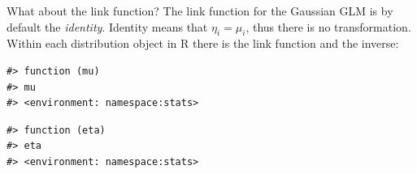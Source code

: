 \documentclass[
  ignorenonframetext,
]{beamer}
\newenvironment{Shaded}{\begin{snugshade}}{\end{snugshade}}
\newcommand{\AttributeTok}[1]{\textcolor[rgb]{0.40,0.45,0.13}{#1}}
\newcommand{\CommentTok}[1]{\textcolor[rgb]{0.37,0.37,0.37}{#1}}
\newcommand{\FunctionTok}[1]{\textcolor[rgb]{0.28,0.35,0.67}{#1}}
\newcommand{\NormalTok}[1]{\textcolor[rgb]{0.00,0.23,0.31}{#1}}
\newcommand{\OtherTok}[1]{\textcolor[rgb]{0.00,0.23,0.31}{#1}}
\newcommand{\SpecialCharTok}[1]{\textcolor[rgb]{0.37,0.37,0.37}{#1}}
\newcommand{\StringTok}[1]{\textcolor[rgb]{0.13,0.47,0.30}{#1}}
\begin{document}
\begin{frame}[fragile]{What about the link function?}
\label{what-about-the-link-function}
The link function for the Gaussian GLM is by default the
\emph{identity}. Identity means that \(\eta_i = \mu_i\), thus there is
no transformation. Within each distribution object in R there is the
link function and the inverse:

\begin{Shaded}
\end{Shaded}

\begin{verbatim}
#> function (mu) 
#> mu
#> <environment: namespace:stats>
\end{verbatim}

\begin{Shaded}
\end{Shaded}

\begin{verbatim}
#> function (eta) 
#> eta
#> <environment: namespace:stats>
\end{verbatim}
\end{frame}
\end{document}
